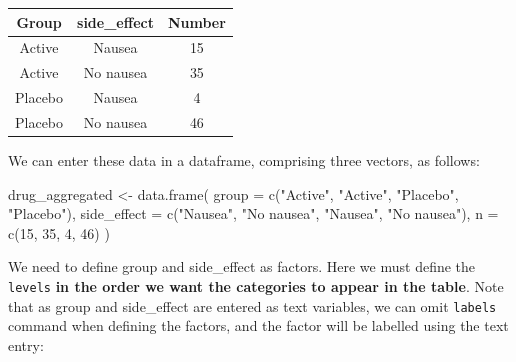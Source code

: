 \documentclass[
]{memoir}
\newenvironment{Shaded}{\begin{snugshade}}{\end{snugshade}}
\newcommand{\AttributeTok}[1]{\textcolor[rgb]{0.77,0.63,0.00}{#1}}
\newcommand{\DecValTok}[1]{\textcolor[rgb]{0.00,0.00,0.81}{#1}}
\newcommand{\FunctionTok}[1]{\textcolor[rgb]{0.00,0.00,0.00}{#1}}
\newcommand{\NormalTok}[1]{#1}
\newcommand{\OtherTok}[1]{\textcolor[rgb]{0.56,0.35,0.01}{#1}}
\newcommand{\SpecialCharTok}[1]{\textcolor[rgb]{0.00,0.00,0.00}{#1}}
\newcommand{\StringTok}[1]{\textcolor[rgb]{0.31,0.60,0.02}{#1}}
\begin{document}
\begin{longtable}[]{@{}ccc@{}}
\toprule()
Group & side\_effect & Number \\
\midrule()
\endhead
Active & Nausea & 15 \\
Active & No nausea & 35 \\
Placebo & Nausea & 4 \\
Placebo & No nausea & 46 \\
\bottomrule()
\end{longtable}

We can enter these data in a dataframe, comprising three vectors, as follows:

\begin{Shaded}
\begin{Highlighting}[]
\NormalTok{drug\_aggregated }\OtherTok{\textless{}{-}} \FunctionTok{data.frame}\NormalTok{(}
  \AttributeTok{group =} \FunctionTok{c}\NormalTok{(}\StringTok{"Active"}\NormalTok{, }\StringTok{"Active"}\NormalTok{, }\StringTok{"Placebo"}\NormalTok{, }\StringTok{"Placebo"}\NormalTok{),}
  \AttributeTok{side\_effect =} \FunctionTok{c}\NormalTok{(}\StringTok{"Nausea"}\NormalTok{, }\StringTok{"No nausea"}\NormalTok{, }\StringTok{"Nausea"}\NormalTok{, }\StringTok{"No nausea"}\NormalTok{),}
  \AttributeTok{n =} \FunctionTok{c}\NormalTok{(}\DecValTok{15}\NormalTok{, }\DecValTok{35}\NormalTok{, }\DecValTok{4}\NormalTok{, }\DecValTok{46}\NormalTok{)}
\NormalTok{)}
\end{Highlighting}
\end{Shaded}

We need to define group and side\_effect as factors. Here we must define the \texttt{levels} \textbf{in the order we want the categories to appear in the table}. Note that as group and side\_effect are entered as text variables, we can omit \texttt{labels} command when defining the factors, and the factor will be labelled using the text entry:

\begin{Shaded}
\end{Shaded}
\end{document}
